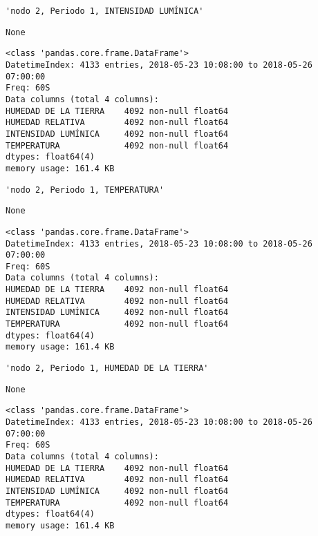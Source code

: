 \documentclass[11pt]{article}
\begin{document}
    
    \begin{verbatim}
'nodo 2, Periodo 1, INTENSIDAD LUMÍNICA'
    \end{verbatim}

    
    
    \begin{verbatim}
None
    \end{verbatim}

    
    \begin{Verbatim}[commandchars=\\\{\}]
<class 'pandas.core.frame.DataFrame'>
DatetimeIndex: 4133 entries, 2018-05-23 10:08:00 to 2018-05-26 07:00:00
Freq: 60S
Data columns (total 4 columns):
HUMEDAD DE LA TIERRA    4092 non-null float64
HUMEDAD RELATIVA        4092 non-null float64
INTENSIDAD LUMÍNICA     4092 non-null float64
TEMPERATURA             4092 non-null float64
dtypes: float64(4)
memory usage: 161.4 KB

    \end{Verbatim}

    
    \begin{verbatim}
'nodo 2, Periodo 1, TEMPERATURA'
    \end{verbatim}

    
    
    \begin{verbatim}
None
    \end{verbatim}

    
    \begin{Verbatim}[commandchars=\\\{\}]
<class 'pandas.core.frame.DataFrame'>
DatetimeIndex: 4133 entries, 2018-05-23 10:08:00 to 2018-05-26 07:00:00
Freq: 60S
Data columns (total 4 columns):
HUMEDAD DE LA TIERRA    4092 non-null float64
HUMEDAD RELATIVA        4092 non-null float64
INTENSIDAD LUMÍNICA     4092 non-null float64
TEMPERATURA             4092 non-null float64
dtypes: float64(4)
memory usage: 161.4 KB

    \end{Verbatim}

    
    \begin{verbatim}
'nodo 2, Periodo 1, HUMEDAD DE LA TIERRA'
    \end{verbatim}

    
    
    \begin{verbatim}
None
    \end{verbatim}

    
    \begin{Verbatim}[commandchars=\\\{\}]
<class 'pandas.core.frame.DataFrame'>
DatetimeIndex: 4133 entries, 2018-05-23 10:08:00 to 2018-05-26 07:00:00
Freq: 60S
Data columns (total 4 columns):
HUMEDAD DE LA TIERRA    4092 non-null float64
HUMEDAD RELATIVA        4092 non-null float64
INTENSIDAD LUMÍNICA     4092 non-null float64
TEMPERATURA             4092 non-null float64
dtypes: float64(4)
memory usage: 161.4 KB

    \end{Verbatim}
\end{document}
